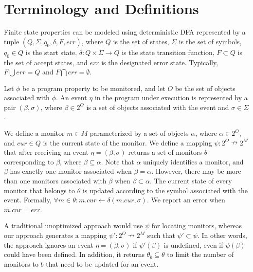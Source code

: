 \section{Terminology and Definitions}
\label{sec:definition}


Finite state properties can be modeled using deterministic DFA 
represented by a tuple $(Q, \Sigma, q_0, \delta, F, err)$, where 
$Q$ is the set of states, $\Sigma$ is the set of symbols, $q_0 \in Q$ is the 
start state, $\delta : Q \times \Sigma \to Q$ is the state transition function, 
$F \subset Q$ is the set of accept states, and $err$ is the designated error 
state. Typically, $F \bigcup err = Q$ and $F \bigcap err = \emptyset$. 

Let $\phi$ be a program property to be monitored, and let $O$ be the set of 
objects associated with $\phi$.  An event $\eta$ in the program under execution 
is represented by a pair $(\beta, \sigma)$, where $\beta \in 2^O$ is a set of 
objects associated with the event and $\sigma \in \Sigma$.

We define a monitor $m \in M$ parameterized by a set of objects $\alpha$, where 
$\alpha \in 2^O$, and $cur \in Q$ is the current state of the monitor. We define 
a mapping $\psi : 2^O \nrightarrow 2^M$ that after receiving an event $\eta = 
(\beta, \sigma)$ returns a set of monitors $\theta$ corresponding to $\beta$, 
where $\beta \subseteq \alpha$. Note that $\alpha$ uniquely identifies a monitor,
and $\beta$ has exactly one monitor associated when $\beta  = \alpha$. However,
there may be more than one monitors associated with $\beta$ 
when $\beta \subset \alpha$. The current state of every monitor that belongs to
$\theta$ is updated according to the symbol associated with the event. Formally, 
$\forall m \in \theta: m.cur \leftarrow \delta(m.cur, \sigma)$. We report an 
error when $m.cur = err$.

 A traditional unoptimized approach would use $\psi$ 
for locating monitors, whereas our approach generates a mapping $\psi': 2^O 
\nrightarrow 2^M$ such that $\psi' \subset \psi$. In other words, the approach 
ignores an event $\eta = (\beta, \sigma)$ if $\psi'(\beta)$ is undefined, even 
if $\psi(\beta)$ could have been defined. In addition, it returns $\theta_b
\subseteq \theta$ to limit the number of monitors to $b$ that need to be updated for an event.

